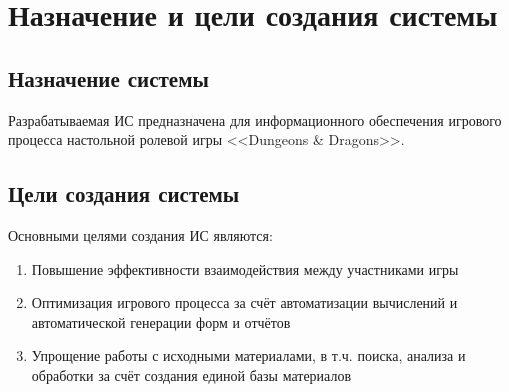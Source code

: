 \section{Назначение и цели создания системы}

\subsection{Назначение системы}
Разрабатываемая ИС предназначена для информационного обеспечения игрового процесса настольной ролевой игры <<Dungeons \& Dragons>>.

\subsection{Цели создания системы}
Основными целями создания ИС являются:
\begin{enumerate}
\item Повышение эффективности взаимодействия между участниками игры
\item Оптимизация игрового процесса за счёт автоматизации вычислений и автоматической генерации форм и отчётов
\item Упрощение работы с исходными материалами, в т.ч. поиска, анализа и обработки за счёт создания единой базы материалов
\end{enumerate}
